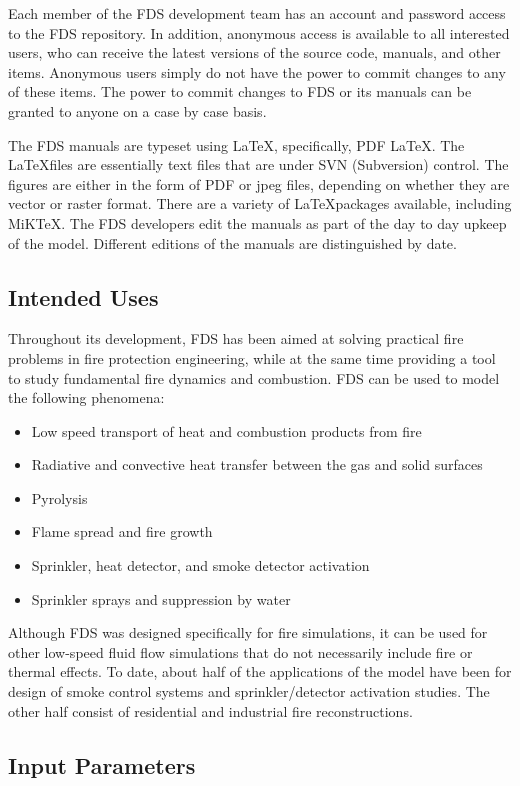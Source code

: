 \documentclass[11pt]{book}
\begin{document}
Each member of the FDS development team has an account and password access to the FDS repository. In addition, anonymous access is available to all
interested users, who can receive the latest versions of the source code, manuals, and other items. Anonymous users simply do not have the power to
commit changes to any of these items. The power to commit changes to FDS or its manuals can be granted to anyone on a case by case basis.

The FDS manuals are typeset using \LaTeX, specifically, PDF \LaTeX. The \LaTeX files are essentially text files that are under SVN (Subversion)
control. The figures are either in the form of PDF or jpeg files, depending on whether they are vector or raster format. There are a variety of
\LaTeX packages available, including MiKTeX. The FDS developers edit the manuals as part of the day to day upkeep of the model. Different editions of
the manuals are distinguished by date.


\subsection{Intended Uses}

Throughout its development, FDS has been aimed at solving practical
fire problems in fire protection engineering, while at the same time
providing a tool to study fundamental fire dynamics and combustion.
FDS can be used to model the following phenomena:
\begin{itemize}
\setlength{\itemsep}{0.0in}
\item Low speed transport of heat and combustion products from fire
\item Radiative and convective heat transfer between the gas and solid surfaces
\item Pyrolysis
\item Flame spread and fire growth
\item Sprinkler, heat detector, and smoke detector activation
\item Sprinkler sprays and suppression by water
\end{itemize}
Although FDS was designed specifically for fire simulations,
it can be used for other low-speed fluid flow simulations that do not necessarily
include fire or thermal effects. To date, about half of the
applications of the model have been for design of smoke control
systems and sprinkler/detector activation studies.
The other half consist of residential and industrial fire reconstructions.


\subsection{Input Parameters}
\end{document}
